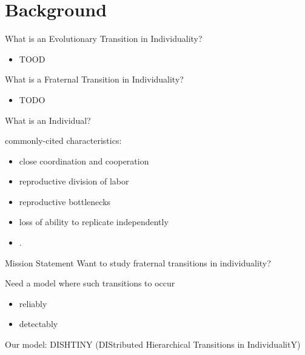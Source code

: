 \section{Background}

\begin{frame}{What is an Evolutionary Transition in Individuality?}

\begin{itemize}
\item TOOD
\end{itemize}

\end{frame}

\begin{frame}{What is a Fraternal Transition in Individuality?}

\begin{itemize}
\item TODO
\end{itemize}

\end{frame}

\begin{frame}{What is an Individual?}

commonly-cited characteristics:
\begin{itemize}
\item close coordination and cooperation
\item reproductive division of labor
\item reproductive bottlenecks
\item loss of ability to replicate independently
\item \cite{ereshefsky2015rethinking, bouchard2013symbiotic}.
\end{itemize}

\end{frame}

\begin{frame}{Mission Statement}
Want to study fraternal transitions in individuality?

\pause

Need a model where such transitions to occur
\begin{itemize}
\item reliably
\item detectably
\end{itemize}

\pause

Our model: DISHTINY \footnotesize{(DIStributed Hierarchical Transitions in IndividualitY)}

\end{frame}
